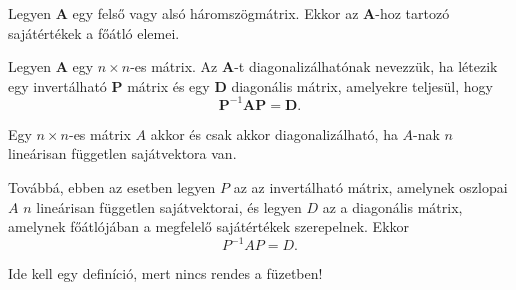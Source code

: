 \documentclass[a4paper, 12pt]{scrartcl}
\begin{document}
\begin{note}
  Legyen \( \textbf{A} \) egy felső vagy alsó háromszögmátrix. Ekkor az \( \textbf{A} \)-hoz tartozó sajátértékek a főátló elemei.
\end{note}

\begin{definition}
  Legyen \( \textbf{A} \) egy \( n \times n \)-es mátrix. Az \( \textbf{A} \)-t diagonalizálhatónak nevezzük, ha létezik egy invertálható \( \textbf{P} \) mátrix és egy \( \textbf{D} \) diagonális mátrix, amelyekre teljesül, hogy
  \[
    \textbf{P}^{-1}\textbf{AP} = \textbf{D}.
  \]
\end{definition}

\begin{theorem}
  Egy \( n \times n \)-es mátrix \( A \) akkor és csak akkor diagonalizálható, ha \( A \)-nak \( n \) lineárisan független sajátvektora van.

  Továbbá, ebben az esetben legyen \( P \) az az invertálható mátrix, amelynek oszlopai \( A \) \( n \) lineárisan független sajátvektorai, és legyen \( D \) az a diagonális mátrix, amelynek főátlójában a megfelelő sajátértékek szerepelnek. Ekkor
  \[
    P^{-1}AP = D.
  \]
\end{theorem}

\begin{definition}[Mátrixfüggvények]
  Ide kell egy definíció, mert nincs rendes a füzetben!
\end{definition}
\end{document}
